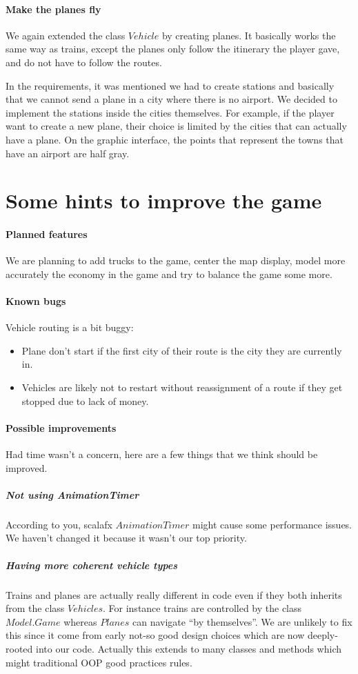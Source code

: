 \documentclass[a4paper]{article}
\begin{document}
	\paragraph{Make the planes fly}
	We again extended the class $Vehicle$ by creating planes. It basically works the same way as trains, except the planes only follow the itinerary the player gave, and do not have to follow the routes.

	In the requirements, it was mentioned we had to create stations and basically that we cannot send a plane in a city where there is no airport. We decided to implement the stations inside the cities themselves. For example, if the player want to create a new plane, their choice is limited by the cities that can actually have a plane. On the graphic interface, the points that represent the towns that have an airport are half gray.


	\section{Some hints to improve the game}
	\paragraph{Planned features}
	We are planning to add trucks to the game, center the map display, model more accurately the economy in the game and try to balance the game some more.

	\paragraph{Known bugs}
	Vehicle routing is a bit buggy:
	\begin{itemize}
		\item Plane don't start if the first city of their route is the city they are currently in.
		\item Vehicles are likely not to restart without reassignment of a route if they get stopped due to lack of money.
	\end{itemize}

	\paragraph{Possible improvements} Had time wasn't a concern, here are a few things that we think should be improved.
	\subparagraph{Not using AnimationTimer} According to you, scalafx $AnimationTimer$ might cause some performance issues. We haven't changed it because it wasn't our top priority.
	\subparagraph{Having more coherent vehicle types}
	Trains and planes are actually really different in code even if they both inherits from the class $Vehicles$. For instance trains are controlled by the class $Model.Game$ whereas $Planes$ can navigate ``by themselves''. We are unlikely to fix this since it come from early not-so good design choices which are now deeply-rooted into our code. Actually this extends to many classes and methods which might traditional OOP good practices rules.
\end{document}
